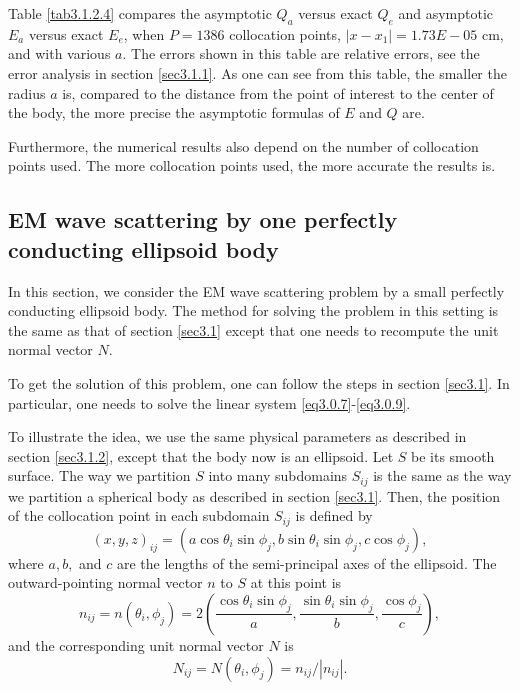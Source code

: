 \documentclass[12pt]{article}
\numberwithin{equation}{section}
\newcommand{\be}{\begin{equation}}
\newcommand{\ee}{\end{equation}}
\begin{document}
Table \ref{tab3.1.2.4} compares the asymptotic $Q_a$ versus exact $Q_e$ and asymptotic $E_a$ versus exact $E_e$, when $P=1386$ collocation points, $|x-x_1|=1.73E-05$ cm, and with various $a$. The errors shown in this table are relative errors, see  the error analysis in section \ref{sec3.1.1}. As one can see from this table, the smaller the radius $a$ is, compared to the distance from the point of interest to the center of the body, the more precise the asymptotic formulas of $E$ and $Q$ are.

Furthermore, the numerical results also depend on the number of collocation points used. The more collocation points used, the more accurate the results is.

\subsection{EM wave scattering by one perfectly conducting ellipsoid body}\label{sec3.2}
In this section, we consider the EM wave scattering problem by a small perfectly conducting ellipsoid body. The method for solving the problem in this setting is the same as that of section \ref{sec3.1} except that one needs to recompute the unit normal vector $N$.

To get the solution of this problem, one can follow the steps in section \ref{sec3.1}. In particular, one needs to solve the linear system \eqref{eq3.0.7}-\eqref{eq3.0.9}.

To illustrate the idea, we use the same physical parameters as described in section \ref{sec3.1.2}, except that the body now is an ellipsoid. Let $S$ be its smooth surface. The way we partition $S$ into many subdomains $S_{ij}$ is the same as the way we partition a spherical body as described in section \ref{sec3.1}. Then, the position of the collocation point in each subdomain $S_{ij}$ is defined by
\be \label{eq3.2.1}
    (x,y,z)_{ij} = (a\cos\theta_i \sin\phi_j,b\sin\theta_i \sin\phi_j,c\cos\phi_j),
\ee
where $a, b,$ and $c$ are the lengths of the semi-principal axes of the ellipsoid. The outward-pointing  normal vector $n$ to $S$ at this point is
\be \label{eq3.2.2}
    n_{ij}=n(\theta_i,\phi_j)=2\left(\frac{\cos\theta_i \sin\phi_j}{a},\frac{\sin\theta_i \sin\phi_j}{b},\frac{\cos\phi_j}{c}\right),
\ee
and the corresponding unit normal vector $N$ is
\be \label{eq3.2.3}
    N_{ij}=N(\theta_i,\phi_j)=n_{ij}/|n_{ij}|.
\ee
\end{document}

